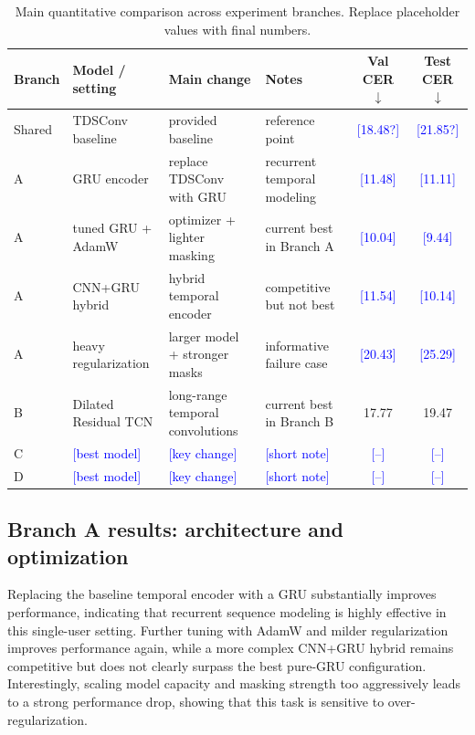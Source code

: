 \documentclass{article}
\newcommand{\todo}[1]{\textcolor{blue}{[#1]}}
\begin{document}
\begin{table}[t]
    \centering
    \caption{Main quantitative comparison across experiment branches. Replace placeholder values with final numbers.}
    \label{tab:main-results}
    \small
    \begin{tabular}{llllcc}
        \toprule
        Branch & Model / setting & Main change & Notes & Val CER $\downarrow$ & Test CER $\downarrow$ \\
        \midrule
        Shared & TDSConv baseline & provided baseline & reference point & \todo{18.48?} & \todo{21.85?} \\
        A & GRU encoder & replace TDSConv with GRU & recurrent temporal modeling & \todo{11.48} & \todo{11.11} \\
        A & tuned GRU + AdamW & optimizer + lighter masking & current best in Branch A & \todo{10.04} & \todo{9.44} \\
        A & CNN+GRU hybrid & hybrid temporal encoder & competitive but not best & \todo{11.54} & \todo{10.14} \\
        A & heavy regularization & larger model + stronger masks & informative failure case & \todo{20.43} & \todo{25.29} \\
        B & Dilated Residual TCN & long-range temporal convolutions & current best in Branch B & 17.77 & 19.47 \\
        C & \todo{best model} & \todo{key change} & \todo{short note} & \todo{--} & \todo{--} \\
        D & \todo{best model} & \todo{key change} & \todo{short note} & \todo{--} & \todo{--} \\
        \bottomrule
    \end{tabular}
\end{table}

\subsection{Branch A results: architecture and optimization}
Replacing the baseline temporal encoder with a GRU substantially improves performance, indicating that recurrent sequence modeling is highly effective in this single-user setting.
Further tuning with AdamW and milder regularization improves performance again, while a more complex CNN+GRU hybrid remains competitive but does not clearly surpass the best pure-GRU configuration.
Interestingly, scaling model capacity and masking strength too aggressively leads to a strong performance drop, showing that this task is sensitive to over-regularization.
\end{document}
